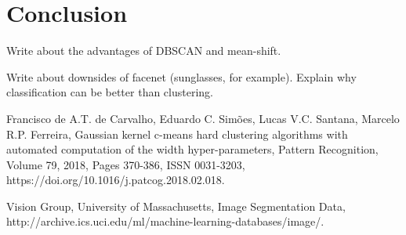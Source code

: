 \documentclass[conference]{IEEEtran}
\begin{document}
\section{Conclusion}

Write about the advantages of DBSCAN and mean-shift.

Write about downsides of facenet (sunglasses, for example).
Explain why classification can be better than clustering.

\begin{thebibliography}{00}
 Francisco de A.T. de Carvalho, Eduardo C. Simões, Lucas V.C. Santana, Marcelo R.P. Ferreira,
Gaussian kernel c-means hard clustering algorithms with automated computation of the width hyper-parameters,
Pattern Recognition,
Volume 79,
2018,
Pages 370-386,
ISSN 0031-3203,
https://doi.org/10.1016/j.patcog.2018.02.018.

 Vision Group, University of Massachusetts, 
Image Segmentation Data,
http://archive.ics.uci.edu/ml/machine-learning-databases/image/.

\end{thebibliography}
\end{document}
